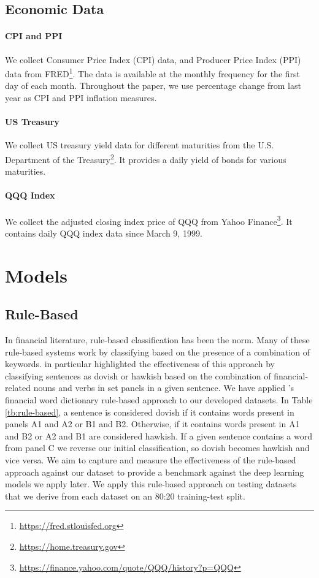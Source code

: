 \documentclass[11pt]{article}
\begin{document}
\subsection{Economic Data}
\paragraph{CPI and PPI} We collect Consumer Price Index (CPI) data, and Producer Price Index (PPI) data from FRED\footnote{\url{https://fred.stlouisfed.org}}. The data is available at the monthly frequency for the first day of each month. Throughout the paper, we use percentage change from last year as CPI and PPI inflation measures. 

\paragraph{US Treasury} We collect US treasury yield data for different maturities from the U.S. Department of the Treasury\footnote{\url{https://home.treasury.gov}}. It provides a daily yield of bonds for various maturities.  

\paragraph{QQQ Index} We collect the adjusted closing index price of QQQ from Yahoo Finance\footnote{\url{https://finance.yahoo.com/quote/QQQ/history?p=QQQ}}. It contains daily QQQ index data since March 9, 1999. 


\section{Models}
\subsection{Rule-Based}
In financial literature, rule-based classification has been the norm. Many of these rule-based systems work by classifying based on the presence of a combination of keywords. \citet{gorodnichenko2021voice} in particular highlighted the effectiveness of this approach by classifying sentences as dovish or hawkish based on the combination of financial-related nouns and verbs in set panels in a given sentence. We have applied \citeauthor{gorodnichenko2021voice}'s financial word dictionary rule-based approach to our developed datasets. In Table \ref{tb:rule-based}, a sentence is considered dovish if it contains words present in panels A1 and A2 or B1 and B2. Otherwise, if it contains words present in A1 and B2 or A2 and B1 are considered hawkish. If a given sentence contains a word from panel C we reverse our initial classification, so dovish becomes hawkish and vice versa.
We aim to capture and measure the effectiveness of the rule-based approach against our dataset to provide a benchmark against the deep learning models we apply later. We apply this rule-based approach on testing datasets that we derive from each dataset on an 80:20 training-test split.
\end{document}
